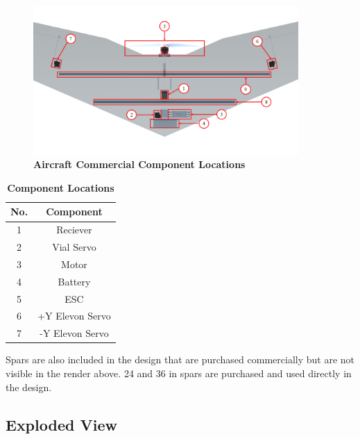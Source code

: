         \begin{figure}[H]
            \centering
            \includegraphics[width=0.9\textwidth]{homeworks/homework4/report/Figure/aircraft_assembly_underbelly_labeled.png}
            \caption{\textbf{Aircraft Commercial Component Locations}}
            \label{fig:component_locations}
        \end{figure}
        
        \begin{table}[H]
        \begin{center}
        \caption{\textbf{Component Locations}} \label{tab:component_locations}
        \begin{tabular}{|c|c|} 
            \hline
            \textbf{No.} & \textbf{Component} \\ \hline
            1 & Reciever \\ \hline
            2 & Vial Servo \\ \hline
            3 & Motor \\ \hline
            4 & Battery \\ \hline
            5 & ESC \\ \hline
            6 & +Y Elevon Servo \\ \hline
            7 & -Y Elevon Servo \\ \hline
        \end{tabular}
        \end{center}
        \end{table}
        
        Spars are also included in the design that are purchased commercially but are not visible in the render above. 24 and 36 in spars are purchased and used directly in the design. 
    
    \subsection{Exploded View}
    
